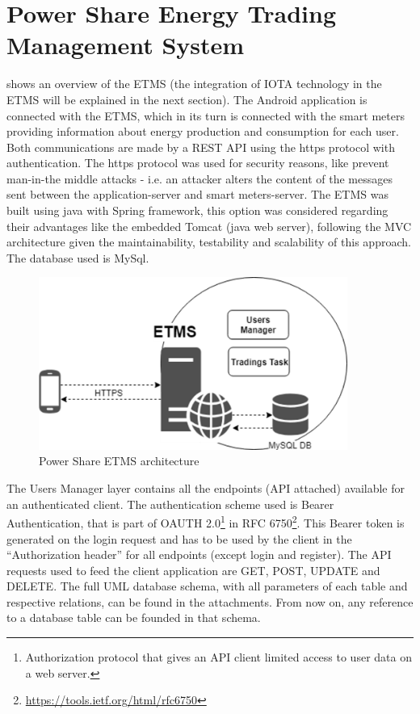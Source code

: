 \section{Power Share Energy Trading Management System}\label{psetms}


 shows an overview of the ETMS (the integration of IOTA technology in the ETMS will be explained in the next section). The Android application is connected with the ETMS, which in its turn is connected with the smart meters providing information about energy production and consumption for each user. Both communications are made by a REST API using the https protocol with authentication. The https protocol was used for security reasons, like prevent man-in-the middle attacks - i.e. an attacker alters the content of the messages sent between the application-server and smart meters-server.
The ETMS was built using java with Spring framework, this option was considered regarding their advantages like the embedded Tomcat (java web server), following the \ac{MVC} architecture given the maintainability, testability and scalability of this approach. The database used is MySql.


\begin{figure}[h]
\centering
\includegraphics[width=0.9\textwidth]{./Images/ps12}
\caption{Power Share \ac{ETMS} architecture}
\label{fig:ps12}
\end{figure}

The Users Manager layer contains all the endpoints (\ac{API} attached) available for an authenticated client. The authentication scheme used is Bearer Authentication, that is part of OAUTH 2.0\footnote{Authorization protocol that gives an \ac{API} client limited access to user data on a web server.} in RFC 6750\footnote{\url{https://tools.ietf.org/html/rfc6750}}. This Bearer token is generated on the login request and has to be used by the client in the “Authorization header” for all endpoints (except login and register). The API requests used to feed the client application are GET, POST, UPDATE and DELETE. The full \ac{UML} database schema, with all parameters of each table and respective relations, can be found in the attachments. From now on, any reference to a database table can be founded in that schema. 


